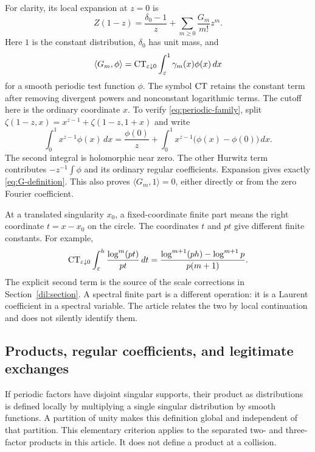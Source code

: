 For clarity, its local expansion at $z=0$ is
\begin{equation}\label{eq:periodic-family}
 Z(1-z)=\frac{\delta_0-1}{z}
              +\sum_{m\ge0}\frac{G_m}{m!}z^m.
\end{equation}
Here $1$ is the constant distribution, $\delta_0$ has unit mass, and
\begin{equation}\label{eq:G-definition}
 \langle G_m,\phi\rangle
 =\operatorname{CT}_{\varepsilon\downarrow0}
         \int_\varepsilon^1\gamma_m(x)\phi(x)\,dx
\end{equation}
for a smooth periodic test function $\phi$.  The symbol $\operatorname{CT}$ retains
the constant term after removing divergent powers and nonconstant
logarithmic terms.  The cutoff here is the ordinary coordinate $x$.
To verify \eqref{eq:periodic-family}, split
$\zeta(1-z,x)=x^{z-1}+\zeta(1-z,1+x)$ and write
\[
 \int_0^1x^{z-1}\phi(x)\,dx
   =\frac{\phi(0)}z+
      \int_0^1x^{z-1}\bigl(\phi(x)-\phi(0)\bigr)\,dx.
\]
The second integral is holomorphic near zero.  The other Hurwitz term
contributes $-z^{-1}\int\phi$ and its ordinary regular coefficients.
Expansion gives exactly \eqref{eq:G-definition}.  This also proves
$\langle G_m,1\rangle=0$, either directly or from the zero Fourier
coefficient.

At a translated singularity $x_0$, a fixed-coordinate finite part means
the right coordinate $t=x-x_0$ on the circle.  The coordinates $t$ and
$pt$ give different finite constants.  For example,
\[
 \operatorname{CT}_{\varepsilon\downarrow0}\int_\varepsilon^h
              \frac{\log^m(pt)}{pt}\,dt
 =\frac{\log^{m+1}(ph)-\log^{m+1}p}{p(m+1)}.
\]
The explicit second term is the source of the scale corrections in
Section~\ref{dil:section}.  A spectral finite part is a different
operation: it is a Laurent coefficient in a spectral variable.  The
article relates the two by local continuation and does not silently
identify them.

\subsection{Products, regular coefficients, and legitimate exchanges}

If periodic factors have disjoint singular supports, their product as
distributions is defined locally by multiplying a single singular
distribution by smooth functions.  A partition of unity makes this
definition global and independent of that partition.  This elementary
criterion applies to the separated two- and three-factor products in
this article.  It does not define a product at a collision.


